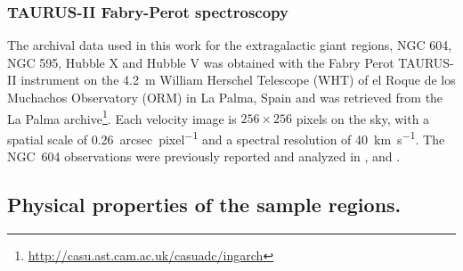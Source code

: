 \documentclass[fleqn,usenatbib, useAMS, a4paper]{mnras}
\begin{document}
\subsubsection{TAURUS-II Fabry-Perot spectroscopy}
\label{sec:taurus-ii-fabry}

The archival data used in this work for the extragalactic giant regions, NGC 604, NGC 595, Hubble X and Hubble V was obtained with the Fabry Perot TAURUS-II instrument
\citep{Gordon:2000v}
on the \SI{4.2}{m} William Herschel Telescope (WHT) of
el Roque de los Muchachos Observatory (ORM) in La Palma, Spain
and was retrieved from the La Palma archive\footnote{\url{http://casu.ast.cam.ac.uk/casuadc/ingarch}}.
Each velocity image is \(256 \times 256\) pixels on the sky,
with a spatial scale of \SI{0.26}{arcsec.pixel^{-1}}
and a spectral resolution of \SI{40}{km.s^{-1}}.
The NGC~604 observations were previously reported and analyzed in
\citet{sabalisck1995supersonic}, \citet{Medina-Tanco:1997a} and \citet{Melnick:2021x}.



\subsection{Physical properties of the sample regions. }
\label{sec:regions-milky-way}
\end{document}
